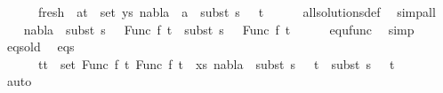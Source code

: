 \begin{isabellebody}
\ \ \ \ \ \ fresh{\isacharcolon}{\kern0pt}\ {\isachardoublequoteopen}{\isasymforall}\ {\isacharparenleft}{\kern0pt}a{\isacharcomma}{\kern0pt}t{\isacharparenright}{\kern0pt}\ {\isasymin}\ set\ ys{\isachardot}{\kern0pt}\ nabla{}\ {\isasymturnstile}\ a\ {\isasymsharp}\ subst\ {\isacharparenleft}{\kern0pt}s{}\ {\isasymbullet}\ {\isacharbrackleft}{\kern0pt}{\isacharbrackright}{\kern0pt}{\isacharparenright}{\kern0pt}\ t{\isachardoublequoteclose}\isanewline
\ \ \ \ \isamarkupfalse%
\ all{\isacharunderscore}{\kern0pt}solutions{\isacharunderscore}{\kern0pt}def\ \isamarkupfalse%
\ simp{\isacharunderscore}{\kern0pt}all\isanewline
\ \ \isamarkupfalse%
\ {\isachardoublequoteopen}nabla{}\ {\isasymturnstile}\ subst\ {\isacharparenleft}{\kern0pt}s{}\ {\isasymbullet}\ {\isacharbrackleft}{\kern0pt}{\isacharbrackright}{\kern0pt}{\isacharparenright}{\kern0pt}\ {\isacharparenleft}{\kern0pt}Func\ f\ t{}{\isacharparenright}{\kern0pt}\ {\isasymapprox}\ subst\ {\isacharparenleft}{\kern0pt}s{}\ {\isasymbullet}\ {\isacharbrackleft}{\kern0pt}{\isacharbrackright}{\kern0pt}{\isacharparenright}{\kern0pt}\ {\isacharparenleft}{\kern0pt}Func\ f\ t{}{\isacharparenright}{\kern0pt}{\isachardoublequoteclose}\isanewline
\ \ \ \ \isamarkupfalse%
\ equ{\isacharunderscore}{\kern0pt}func\ \isamarkupfalse%
\ simp\isanewline
\ \ \isamarkupfalse%
\ eqs{\isacharunderscore}{\kern0pt}old\ \isamarkupfalse%
\ eqs{\isacharcolon}{\kern0pt}\isanewline
\ \ \ \ \ {\isachardoublequoteopen}{\isasymforall}\ {\isacharparenleft}{\kern0pt}t{}{\isacharcomma}{\kern0pt}t{}{\isacharparenright}{\kern0pt}\ {\isasymin}\ set\ {\isacharparenleft}{\kern0pt}{\isacharparenleft}{\kern0pt}Func\ f\ t{}{\isacharcomma}{\kern0pt}\ Func\ f\ t{}{\isacharparenright}{\kern0pt}\ {\isacharhash}{\kern0pt}\ xs{\isacharparenright}{\kern0pt}{\isachardot}{\kern0pt}\ nabla{}\ {\isasymturnstile}\ subst\ {\isacharparenleft}{\kern0pt}s{}\ {\isasymbullet}\ {\isacharbrackleft}{\kern0pt}{\isacharbrackright}{\kern0pt}{\isacharparenright}{\kern0pt}\ t{}\ {\isasymapprox}\ subst\ {\isacharparenleft}{\kern0pt}s{}\ {\isasymbullet}\ {\isacharbrackleft}{\kern0pt}{\isacharbrackright}{\kern0pt}{\isacharparenright}{\kern0pt}\ t{}{\isachardoublequoteclose}\isanewline
\ \ \ \ \ \isamarkupfalse%
\ auto\isanewline

\end{isabellebody}
